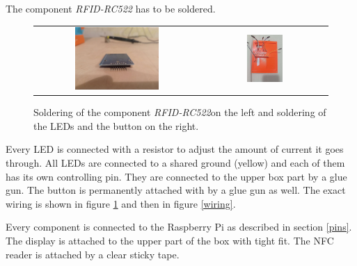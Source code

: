 \documentclass{article}
\begin{document}
    The component \emph{RFID-RC522} has to be soldered. 
\begin{figure}[ht]
    \centering
    \begin{tabular}{cc}
        \label{soldering}
        \includegraphics[width=0.53\textwidth]{imgs/Soldering1.jpg}
        &
        \includegraphics[width=0.3\textwidth]{imgs/Soldering2.jpg}
    \end{tabular}
    \caption{Soldering of the component \emph{RFID-RC522}on the left and soldering of the LEDs and the button on the right.}
\end{figure}

    Every LED is connected with a resistor to adjust the amount of current it goes through. 
    All LEDs are connected to a shared ground (yellow) and each of them has its own controlling pin.
    They are connected to the upper box part by a glue gun.
    The button is permanently attached with by a glue gun as well.
    The exact wiring is shown in figure \ref{soldering} and then in figure \ref{wiring}.

    Every component is connected to the Raspberry Pi as described in section \ref{pins}. 
    The display is attached to the upper part of the box with tight fit.
    The NFC reader is attached by a clear sticky tape.
\end{document}
